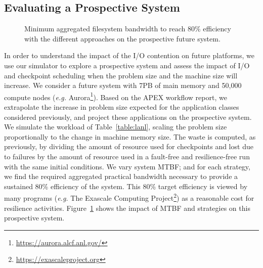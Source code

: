 \documentclass[two]{article}
\newcommand{\eg}[0]{\emph{e.g.}\xspace}
\newcommand{\fifononblock}{\emph{Ordered-NB}\xspace}
\def\fifofixed{\fifononblock-Fixed\xspace}
\begin{document}

\subsection{Evaluating a Prospective System}

\begin{figure}
  \begin{center}
    \resizebox{1.05\linewidth}{!}{}
  \end{center}
  \caption{Minimum aggregated filesystem bandwidth to reach 80\%
    efficiency with the different approaches on the prospective
    future system.\label{fig:prosp}}
\end{figure}

In order to understand the impact of the I/O contention on future platforms, we
use our simulator to explore a prospective system and assess the impact of I/O
and checkpoint scheduling when the problem size and the machine size will
increase. We consider a future system with 7PB of main memory and 50,000
compute nodes (\eg Aurora\footnote{\url{https://aurora.alcf.anl.gov/}}). Based
on the APEX workflow report, we extrapolate the increase in problem size
expected for the application classes considered previously, and project these
applications on the prospective system.  We simulate the workload of
Table~\ref{table:lanl}, scaling the problem size proportionally to the change
in machine memory size. The waste is computed, as previously, by dividing the
amount of resource used for checkpoints and lost due to failures by the amount
of resource used in a fault-free and resilience-free run with the same initial
conditions.
%
We vary system MTBF; and for each strategy, we find the required aggregated
practical bandwidth necessary to provide a sustained 80\% efficiency of the
system.  This 80\% target efficiency is viewed by many programs (\eg 
The Exascale Computing Project\footnote{\url{https://exascaleproject.org}}) as a
reasonable cost for resilience activities.
%
Figure~\ref{fig:prosp} shows the impact of MTBF and strategies on this
prospective system.
\end{document}
